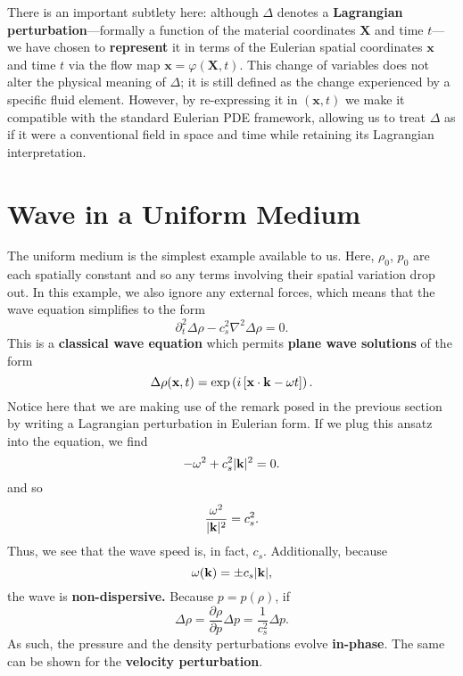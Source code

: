 \begin{remark}
There is an important subtlety here: although $\Delta$ denotes a \textbf{Lagrangian perturbation}---formally a function of the material coordinates $\mathbf{X}$ and time $t$---we have chosen to \textbf{represent} it in terms of the Eulerian spatial coordinates $\mathbf{x}$ and time $t$ via the flow map $\mathbf{x} = \varphi(\mathbf{X}, t)$. This change of variables does not alter the physical meaning of $\Delta$; it is still defined as the change experienced by a specific fluid element. However, by re-expressing it in $(\mathbf{x}, t)$ we make it compatible with the standard Eulerian PDE framework, allowing us to treat $\Delta$ as if it were a conventional field in space and time while retaining its Lagrangian interpretation.
\end{remark}

\section{Wave in a Uniform Medium}

The uniform medium is the simplest example available to us. Here, $\rho_0$, $p_0$ are each spatially constant and so any terms involving their
spatial variation drop out. In this example, we also ignore any external forces, which means that the wave equation simplifies to the form
\[
\partial_t^2 \Delta \rho - c_s^2\nabla^2 \Delta \rho = 0.
\]
This is a \textbf{classical wave equation} which permits \textbf{plane wave solutions} of the form
\[
\Delta \rho(\textbf{x},t) = \exp\left(i\left[{\bf x}\cdot {\bf k} - \omega t\right]\right).
\]
Notice here that we are making use of the remark posed in the previous section by writing a Lagrangian perturbation in Eulerian form. If we plug this ansatz into the equation, we find
\[
-\omega^2 + c_s^2 |{\bf k}|^2 = 0.
\]
and so
\[
\frac{\omega^2}{|{\bf k}|^2} = c_s^2.
\]
Thus, we see that the wave speed is, in fact, $c_s$. Additionally, because
\[
\omega({\bf k}) = \pm c_s|{\bf k}|,
\]
the wave is \textbf{non-dispersive.} Because $p = p(\rho)$, if 
\[
\Delta \rho = \frac{\partial \rho}{\partial p} \Delta p = \frac{1}{c_s^2} \Delta p.
\]
As such, the pressure and the density perturbations evolve \textbf{in-phase}. The same can be shown for the \textbf{velocity perturbation}.

